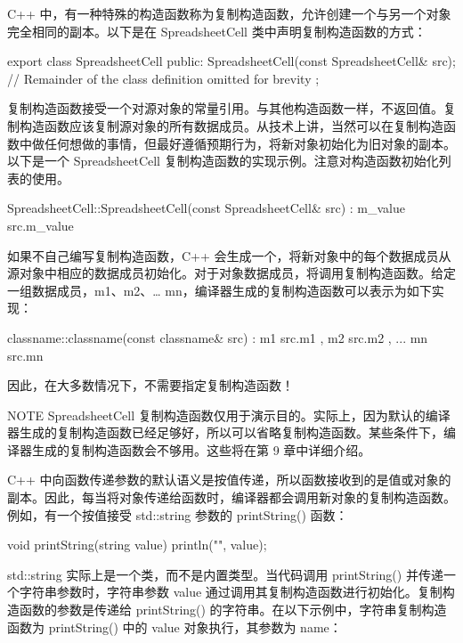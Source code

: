 
C++ 中，有一种特殊的构造函数称为复制构造函数，允许创建一个与另一个对象完全相同的副本。以下是在 SpreadsheetCell 类中声明复制构造函数的方式：

\begin{cpp}
export class SpreadsheetCell
{
    public:
        SpreadsheetCell(const SpreadsheetCell& src);
        // Remainder of the class definition omitted for brevity
};
\end{cpp}

复制构造函数接受一个对源对象的常量引用。与其他构造函数一样，不返回值。复制构造函数应该复制源对象的所有数据成员。从技术上讲，当然可以在复制构造函数中做任何想做的事情，但最好遵循预期行为，将新对象初始化为旧对象的副本。以下是一个 SpreadsheetCell 复制构造函数的实现示例。注意对构造函数初始化列表的使用。

\begin{cpp}
SpreadsheetCell::SpreadsheetCell(const SpreadsheetCell& src)
: m_value { src.m_value }
{}
\end{cpp}

如果不自己编写复制构造函数，C++ 会生成一个，将新对象中的每个数据成员从源对象中相应的数据成员初始化。对于对象数据成员，将调用复制构造函数。给定一组数据成员，m1、m2、… mn，编译器生成的复制构造函数可以表示为如下实现：

\begin{cpp}
classname::classname(const classname& src)
: m1 { src.m1 }, m2 { src.m2 }, ... mn { src.mn } { }
\end{cpp}

因此，在大多数情况下，不需要指定复制构造函数！

\begin{myNotic}{NOTE}
SpreadsheetCell 复制构造函数仅用于演示目的。实际上，因为默认的编译器生成的复制构造函数已经足够好，所以可以省略复制构造函数。某些条件下，编译器生成的复制构造函数会不够用。这些将在第 9 章中详细介绍。
\end{myNotic}


C++ 中向函数传递参数的默认语义是按值传递，所以函数接收到的是值或对象的副本。因此，每当将对象传递给函数时，编译器都会调用新对象的复制构造函数。例如，有一个按值接受 std::string 参数的 printString() 函数：

\begin{cpp}
void printString(string value)
{
    println("{}", value);
}
\end{cpp}

std::string 实际上是一个类，而不是内置类型。当代码调用 printString() 并传递一个字符串参数时，字符串参数 value 通过调用其复制构造函数进行初始化。复制构造函数的参数是传递给 printString() 的字符串。在以下示例中，字符串复制构造函数为 printString() 中的 value 对象执行，其参数为 name：

